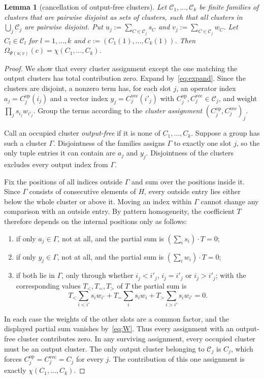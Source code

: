 \documentclass[11pt]{amsart}
\newtheorem{lemma}[theorem]{Lemma}
\theoremstyle{definition}
\theoremstyle{remark}
\numberwithin{equation}{section}
\newcommand{\cC}{\mathcal{C}}
\newcommand{\Cop}{C^{\mathrm{op}}}
\newcommand{\Cvec}{C^{\mathrm{vec}}}
\theoremstyle{plain}
\theoremstyle{definition}
\theoremstyle{plain}
\begin{document}
\begin{lemma}[cancellation of output-free clusters]\label{lem:C}
Let $\cC_1,\dots,\cC_k$ be finite families of clusters that are pairwise disjoint as sets of clusters, such that all
clusters in $\bigcup_j\cC_j$ are pairwise disjoint. Put $u_j:=\sum_{C\in\cC_j}s_C$ and $v_j:=\sum_{C\in\cC_j}w_C$. Let
$C_l\in\cC_l$ for $l=1,\dots,k$ and $c:=(C_1(1),\dots,C_k(1))$. Then $\Omega_{\Psi(u;v)}(c)=\chi(C_1,\dots,C_k)$.
\end{lemma}

\begin{proof}
We show that every cluster assignment except the one matching the output clusters has total contribution zero.
Expand by~\eqref{eq:expand}. Since the clusters are disjoint, a nonzero term has, for each slot $j$, an operator index
$a_j=\Cop_j(i_j)$ and a vector index $y_j=\Cvec_j(i'_j)$ with $\Cop_j,\Cvec_j\in\cC_j$, and weight
$\prod_js_{i_j}w_{i'_j}$. Group the terms according to the \emph{cluster assignment} $(\Cop_j,\Cvec_j)_{j}$.

Call an occupied cluster \emph{output-free} if it is none of $C_1,\dots,C_k$. Suppose a group has such a cluster
$\Gamma$. Disjointness of the families assigns $\Gamma$ to exactly one slot $j$, so the only tuple entries it can
contain are $a_j$ and $y_j$. Disjointness of the clusters excludes every output index from $\Gamma$.

Fix the positions of all indices outside $\Gamma$ and sum over the positions inside it. Since $\Gamma$ consists of
consecutive elements of $H$, every outside entry lies either below the whole cluster or above it. Moving an index
within $\Gamma$ cannot change any comparison with an outside entry. By pattern homogeneity, the coefficient $T$
therefore depends on the internal positions only as follows:
\begin{enumerate}
\item[(i)] if only $a_j\in\Gamma$, not at all, and the partial sum is $(\sum_is_i)\cdot T=0$;
\item[(ii)] if only $y_j\in\Gamma$, not at all, and the partial sum is $(\sum_iw_i)\cdot T=0$;
\item[(iii)] if both lie in $\Gamma$, only through whether $i_j<i'_j$, $i_j=i'_j$ or $i_j>i'_j$; with the corresponding
values $T_<,T_=,T_>$ of $T$ the partial sum is
\[
T_<\sum_{i<i'}s_iw_{i'}+T_=\sum_is_iw_i+T_>\sum_{i>i'}s_iw_{i'}=0 .
\]
\end{enumerate}
In each case the weights of the other slots are a common factor, and the displayed partial sum vanishes
by~\eqref{eq:W}. Thus every assignment with an output-free cluster contributes zero. In any surviving assignment,
every occupied cluster must be an output cluster. The only output cluster belonging to $\cC_j$ is $C_j$, which forces
$\Cop_j=\Cvec_j=C_j$ for every $j$. The contribution of this one assignment is exactly
$\chi(C_1,\dots,C_k)$.
\end{proof}
\end{document}
